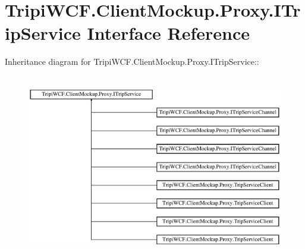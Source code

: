 \hypertarget{interface_tripi_w_c_f_1_1_client_mockup_1_1_proxy_1_1_i_trip_service}{
\section{TripiWCF.ClientMockup.Proxy.ITripService Interface Reference}
\label{interface_tripi_w_c_f_1_1_client_mockup_1_1_proxy_1_1_i_trip_service}
}
Inheritance diagram for TripiWCF.ClientMockup.Proxy.ITripService::\begin{figure}[H]
\begin{center}
\leavevmode
\includegraphics[height=8.10289cm]{interface_tripi_w_c_f_1_1_client_mockup_1_1_proxy_1_1_i_trip_service}
\end{center}
\end{figure}
